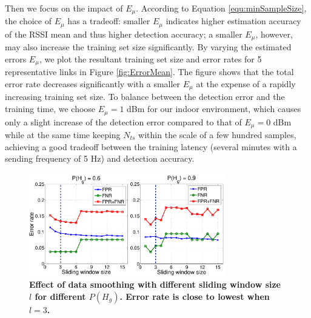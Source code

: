 Then we focus on the impact of $E_{\mu}$. According to Equation \ref{equ:minSampleSize}, the choice of $E_{\mu}$ has a tradeoff: smaller $E_{\mu}$ indicates higher estimation accuracy of the RSSI mean and thus higher detection accuracy; a smaller $E_{\mu}$, however, may also increase the training set size significantly. By varying the estimated errors $E_{\mu}$, we plot the resultant training set size and error rates for 5 representative links in Figure \ref{fig:ErrorMean}. 
The figure shows that the total error rate decreases significantly with a smaller $E_{\mu}$ at the expense of a rapidly increasing training set size. To balance between the detection error and the training time, we choose $E_{\mu} = 1$ dBm for our indoor environment, which causes only a slight increase of the detection error compared to that of $E_{\mu} = 0$ dBm while at the same time keeping $N_{ts}$ within the scale of a few hundred samples, achieving a good tradeoff between the training latency (several minutes with a sending frequency of 5 Hz) and detection accuracy. 

\begin{figure}[t]
	\centering
	\includegraphics[width=1.0\linewidth, height = 4.5cm ]{3-Find_SlidingWindowSize_5}
	\vspace{-0.7cm}
	\caption{\textbf{Effect of data smoothing with different sliding window size $l$ for different $P(H_g)$. Error rate is close to lowest when $l=3$.} }
	\label{fig:EVA-slidingWindow}
	\vspace{-0.3cm}
\end{figure} 

